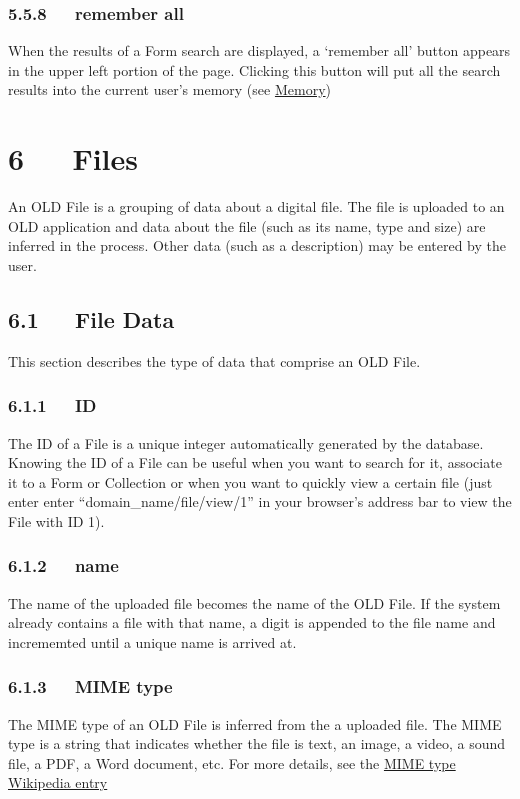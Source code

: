 \documentclass[letterpaper,10pt,english]{sphinxmanual}
\begin{document}
\subsection{5.5.8   remember all}
\label{documentation:remember-all}
When the results of a Form search are displayed, a `remember all' button appears
in the upper left portion of the page.  Clicking this button will put all the
search results into the current user's memory (see {\hyperref[documentation:memory]{Memory}})


\chapter{6   Files}
\label{documentation:files}
An OLD File is a grouping of data about a digital file.  The file is uploaded to
an OLD application and data about the file (such as its name, type and size) are
inferred in the process.  Other data (such as a description) may be entered by
the user.


\section{6.1   File Data}
\label{documentation:file-data}
This section describes the type of data that comprise an OLD File.


\subsection{6.1.1   ID}
\label{documentation:id1}
The ID of a File is a unique integer automatically generated by the database.
Knowing the ID of a File can be useful when you want to search for it, associate
it to a Form or Collection or when you want to quickly view a certain file (just
enter enter ``domain\_name/file/view/1'' in your browser's address bar to view the
File with ID 1).


\subsection{6.1.2   name}
\label{documentation:name}
The name of the uploaded file becomes the name of the OLD File.  If the system
already contains a file with that name, a digit is appended to the file name and
incrememted until a unique name is arrived at.


\subsection{6.1.3   MIME type}
\label{documentation:mime-type}
The MIME type of an OLD File is inferred from the a uploaded file.  The MIME
type is a string that indicates whether the file is text, an image, a video, a
sound file, a PDF, a Word document, etc.  For more details, see the \href{http://en.wikipedia.org/wiki/MIME\_type}{MIME type
Wikipedia entry}
\end{document}

